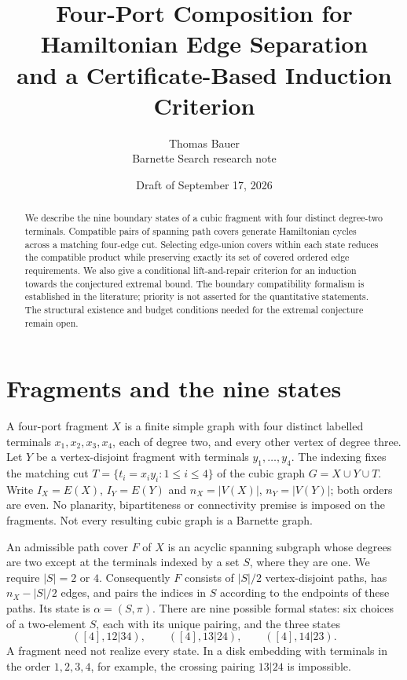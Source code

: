 \documentclass[10pt]{article}
\title{Four-Port Composition for Hamiltonian Edge Separation\\
and a Certificate-Based Induction Criterion}
\author{Thomas Bauer\\\small Barnette Search research note}
\date{Draft of September 17, 2026}
\begin{document}
\maketitle
\begin{abstract}
We describe the nine boundary states of a cubic fragment with four distinct
degree-two terminals. Compatible pairs of spanning path covers generate
Hamiltonian cycles across a matching four-edge cut. Selecting edge-union covers
within each state reduces the compatible product while preserving exactly its
set of covered ordered edge requirements. We also give a conditional
lift-and-repair criterion for an induction towards the conjectured extremal
bound. The boundary compatibility formalism is established in the literature;
priority is not asserted for the quantitative statements. The structural
existence and budget conditions needed for the extremal conjecture remain open.
\end{abstract}

\section{Fragments and the nine states}
A four-port fragment $X$ is a finite simple graph with four distinct labelled
terminals $x_1,x_2,x_3,x_4$, each of degree two, and every other vertex of degree
three. Let $Y$ be a vertex-disjoint fragment with terminals $y_1,\ldots,y_4$.
The indexing fixes the matching cut $T=\{t_i=x_i y_i:1\le i\le4\}$ of the
cubic graph $G=X\cup Y\cup T$. Write $I_X=E(X)$, $I_Y=E(Y)$ and
$n_X=|V(X)|$, $n_Y=|V(Y)|$; both orders are even. No planarity, bipartiteness
or connectivity premise is imposed on the fragments. Not every resulting
cubic graph is a Barnette graph.

An admissible path cover $F$ of $X$ is an acyclic spanning subgraph whose
degrees are two except at the terminals indexed by a set $S$, where they
are one. We require $|S|=2$ or $4$. Consequently $F$ consists of $|S|/2$
vertex-disjoint paths, has $n_X-|S|/2$ edges, and pairs the indices in $S$
according to the endpoints of these paths. Its state is $\alpha=(S,\pi)$.
There are nine possible formal states: six choices of a two-element $S$,
each with its unique pairing, and the three states
\[
 ([4],12|34),\qquad ([4],13|24),\qquad ([4],14|23).
\]
A fragment need not realize every state. In a disk embedding with terminals
in the order $1,2,3,4$, for example, the crossing pairing $13|24$ is impossible.
\end{document}
